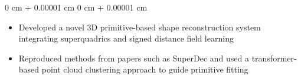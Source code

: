 \documentclass[10pt, letterpaper]{article}
\newenvironment{highlights}{
    \begin{itemize}[
        topsep=0.10 cm,
        parsep=0.10 cm,
        partopsep=0pt,
        itemsep=0pt,
        leftmargin=0 cm + 10pt
    ]
}{
    \end{itemize}
} %
\newenvironment{onecolentry}{
    \begin{adjustwidth}{
        0 cm + 0.00001 cm
    }{
        0 cm + 0.00001 cm
    }
}{
    \end{adjustwidth}
} %
\newenvironment{twocolentry}[2][]{
    \onecolentry
    \def\secondColumn{#2}
    \setcolumnwidth{\fill, 4.5 cm}
    \begin{paracol}{2}
}{
    \switchcolumn \raggedleft \secondColumn
    \end{paracol}
    \endonecolentry
} %
\begin{document}
    \vspace{0.10 cm}
    \begin{onecolentry}
        \begin{highlights}
            \item Developed a novel 3D primitive-based shape reconstruction system integrating superquadrics and signed distance field learning
            \item Reproduced methods from papers such as SuperDec and used a transformer-based point cloud clustering approach to guide primitive fitting
        \end{highlights}
    \end{onecolentry}




\end{document}
